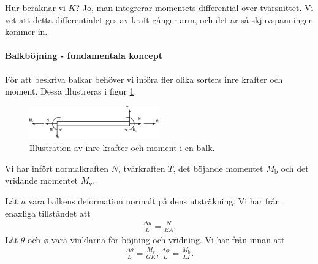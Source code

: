 Hur beräknar vi $K$? Jo, man integrerar momentets differential över tvärsnittet. Vi vet att detta differentialet ges av kraft gånger arm, och det är så skjuvspänningen kommer in.

\paragraph{Balkböjning - fundamentala koncept}
För att beskriva balkar behöver vi införa fler olika sorters inre krafter och moment. Dessa illustreras i figur \ref{fig:beam_forces}.
\begin{figure}[!ht]
	\centering
	\includegraphics[width = 0.5\textwidth]{./Images/beam_forces.eps}
	\caption{Illustration av inre krafter och moment i en balk.}
	\label{fig:beam_forces}
\end{figure}
Vi har infört normalkraften $N$, tvärkraften $T$, det böjande momentet $M_{\text{b}}$ och det vridande momentet $M_{\text{v}}$.

Låt $u$ vara balkens deformation normalt på dens utsträkning. Vi har från enaxliga tillståndet att
\begin{align*}
	\frac{\Delta u}{L} = \frac{N}{EA}.
\end{align*}
Låt $\theta$ och $\phi$ vara vinklarna för böjning och vridning. Vi har från innan att
\begin{align*}
	\frac{\Delta\theta}{L} = \frac{M_{\text{v}}}{GK},
	\frac{\Delta\phi}{L} = \frac{M_{\text{b}}}{EI}.
\end{align*}

